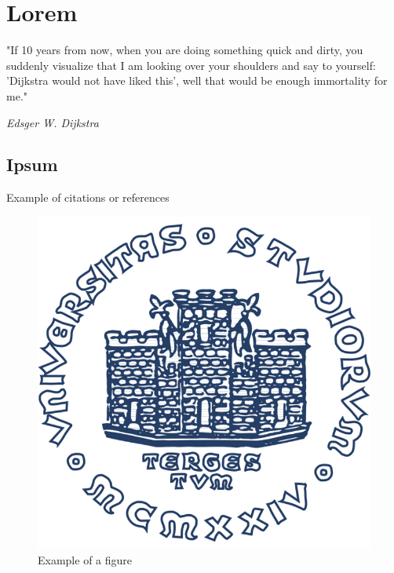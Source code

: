 \chapter{Lorem}\label{chap:lorem}

\epigraph{"If 10 years from now, when you are doing something quick and dirty, you suddenly visualize that I am looking over your shoulders and say to yourself: 'Dijkstra would not have liked this', well that would be enough immortality for me."}{\textit{Edsger W. Dijkstra}}

\section{Ipsum}

Example of citations or references~\cite{einstein}\cite{latexcompanion}

\begin{figure}[h!]\label{fig:example}
\centering
\includegraphics[width=.8\textwidth]{img/units_logo.png}
\caption{Example of a figure}
\end{figure}

\lipsum[3]

